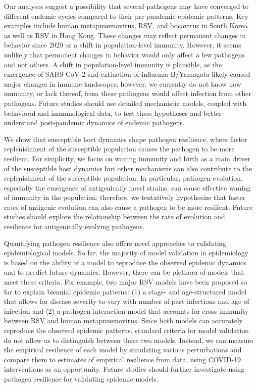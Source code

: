 \documentclass[12pt]{article}
\begin{document}
Our analyses suggest a possibility that several pathogens may have converged to different endemic cycles compared to their pre-pandemic epidemic patterns.
Key examples include human metapnuemovirus, RSV, and bocavirus in South Korea as well as RSV in Hong Kong.
These changes may reflect permanent changes in behavior since 2020 or a shift in population-level immunity.
However, it seems unlikely that permanent changes in behavior would only affect a few pathogens and not others.
A shift in population-level immunity is plausible, as the emergence of SARS-CoV-2 and extinction of influenza B/Yamagata likely caused major changes in immune landscapes;
however, we currently do not know how immunity, or lack thereof, from these pathogens would affect infection from other pathogens.
Future studies should use detailed mechanistic models, coupled with behavioral and immunological data, to test these hypotheses and better understand post-pandemic dynamics of endemic pathogens.

We show that susceptible host dynamics shape pathogen resilience, where faster replenishment of the susceptible population causes the pathogen to be more resilient.
For simplicity, we focus on waning immunity and birth as a main driver of the susceptible host dynamics but other mechanisms can also contribute to the replenishment of the susceptible population.
In particular, pathogen evolution, especially the emergence of antigenically novel strains, can cause effective waning of immunity in the population;
therefore, we tentatively hypothesize that faster rates of antigenic evolution can also cause a pathogen to be more resilient.
Future studies should explore the relationship between the rate of evolution and resilience for antigenically evolving pathogens.

Quantifying pathogen resilience also offers novel approaches to validating epidemiological models.
So far, the majority of model validation in epidemiology is based on the ability of a model to reproduce the observed epidemic dynamics and to predict future dynamics.
However, there can be plethora of models that meet these criteria.
For example, two major RSV models have been proposed so far to explain biennial epidemic patterns: (1) a stage- and age-structured model that allows for disease severity to vary with number of past infections and age of infection and (2) a pathogen-interaction model that accounts for cross immunity between RSV and human metapnuemovirus.
Since both models can accurately reproduce the observed epidemic patterns, standard criteria for model validation do not allow us to distinguish between these two models.
Instead, we can measure the empirical resilience of each model by simulating various perturbations and compare them to estimates of empirical resilience from data, using COVID-19 interventions as an opportunity.
Future studies should further investigate using pathogen resilience for validating epidemic models.
\end{document}
